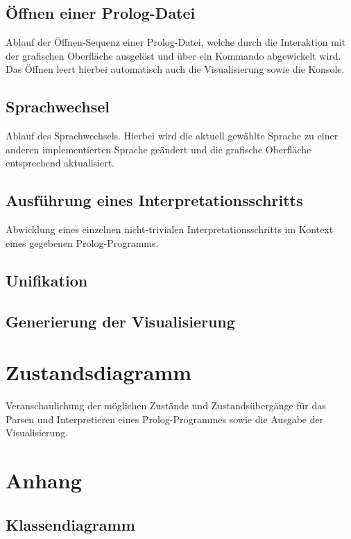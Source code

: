 \documentclass[parskip=full,11pt,twoside]{scrartcl}
\begin{document}
\subsection{Öffnen einer Prolog-Datei}

Ablauf der Öffnen-Sequenz einer Prolog-Datei, welche durch die Interaktion mit der grafischen Oberfläche ausgelöst und über ein Kommando abgewickelt wird. Das Öffnen leert hierbei automatisch auch die Visualisierung sowie die Konsole.

\subsection{Sprachwechsel}

Ablauf des Sprachwechsels. Hierbei wird die aktuell gewählte Sprache zu einer anderen implementierten Sprache geändert und die grafische Oberfläche entsprechend aktualisiert.

\subsection{Ausführung eines Interpretationsschritts}

Abwicklung eines einzelnen nicht-trivialen Interpretationsschritts im Kontext eines gegebenen Prolog-Programms.

\subsection{Unifikation}

\subsection{Generierung der Visualisierung}

\section{Zustandsdiagramm}

Veranschaulichung der möglichen Zustände und Zustandsübergänge für das Parsen und Interpretieren eines Prolog-Programmes sowie die Ausgabe der Visualisierung.

\appendix

\section{Anhang}

\subsection{Klassendiagramm}
\end{document}
